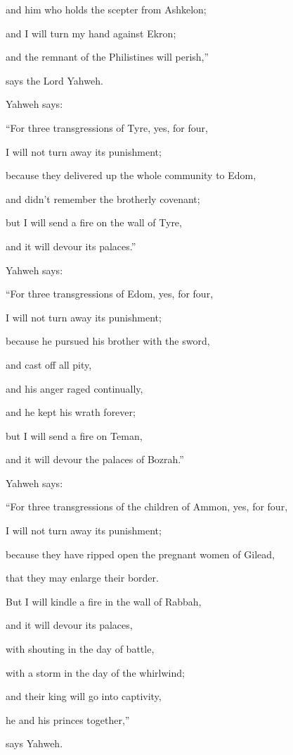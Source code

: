 {\par }{\QB and him who holds the scepter from Ashkelon;
\par }{\Q and I will turn my hand against Ekron;
\par }{\QB and the remnant of the Philistines will perish,”
\par }{\PP says the Lord Yahweh.
\par }{\PP {}Yahweh says:
\par }{\Q “For three transgressions of Tyre, yes, for four,
\par }{\QB I will not turn away its punishment;
\par }{\QB because they delivered up the whole community to Edom,
\par }{\QB and didn’t remember the brotherly covenant;
\par }{\Q {}but I will send a fire on the wall of Tyre,
\par }{\QB and it will devour its palaces.”
\par }{\PP {}Yahweh says:
\par }{\Q “For three transgressions of Edom, yes, for four,
\par }{\QB I will not turn away its punishment;
\par }{\QB because he pursued his brother with the sword,
\par }{\QB and cast off all pity,
\par }{\QB and his anger raged continually,
\par }{\QB and he kept his wrath forever;
\par }{\Q {}but I will send a fire on Teman,
\par }{\QB and it will devour the palaces of Bozrah.”
\par }{\PP {}Yahweh says:
\par }{\Q “For three transgressions of the children of Ammon, yes, for four,
\par }{\QB I will not turn away its punishment;
\par }{\QB because they have ripped open the pregnant women of Gilead,
\par }{\QB that they may enlarge their border.
\par }{\Q {}But I will kindle a fire in the wall of Rabbah,
\par }{\QB and it will devour its palaces,
\par }{\QB with shouting in the day of battle,
\par }{\QB with a storm in the day of the whirlwind;
\par }{\Q {}and their king will go into captivity,
\par }{\QB he and his princes together,”
\par }{\PP says Yahweh.

}
